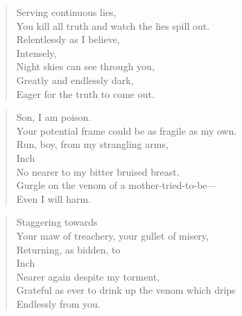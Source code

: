 \vfill

\settowidth{\versewidth}{You kill all truth and watch the lies spill out.}
\hfill\begin{minipage}{\versewidth + \vleftmargin + 15pt}
\begin{verse}
    Serving continuous lies,\\
    You kill all truth and watch the lies spill out.\\
    Relentlessly as I believe,\\
    Intensely,\\
    Night skies can see through you,\\
    Greatly and endlessly dark,\\
    Eager for the truth to come out.\\
\end{verse}
\end{minipage}

\vfill

\clearpage

\settowidth{\versewidth}{Your potential frame could be as fragile as my own.}
\hfill\begin{minipage}{\versewidth + \vleftmargin + 20pt}
\begin{verse}
    Son, I am poison.\\
    Your potential frame could be as fragile as my own.\\
    Run, boy, from my strangling arms,\\
    Inch\\
    No nearer to my bitter bruised breast.\\
    Gurgle on the venom of a mother-tried-to-be—\\
    Even I will harm.\\
\end{verse}
\end{minipage}

\vfill

\begin{verse}
    Staggering towards\\
    Your maw of treachery, your gullet of misery,\\
    Returning, as bidden, to\\
    Inch\\
    Nearer again despite my torment,\\
    Grateful as ever to drink up the venom which drips\\
    Endlessly from you.\\    
\end{verse}

